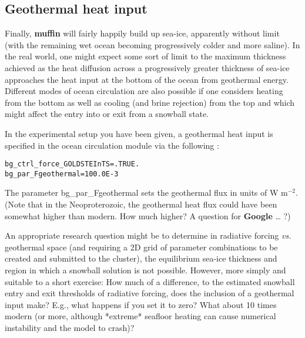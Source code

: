 \documentclass[11pt,fleqn]{book} %
\begin{document}
\vspace{1mm}


\subsection{Geothermal heat input}

Finally, \textbf{muffin} will fairly happily build up sea-ice, apparently without limit (with the remaining wet ocean becoming progressively colder and more saline). In the real world, one might expect some sort of limit to the maximum thickness achieved as the heat diffusion across a progressively greater thickness of sea-ice approaches the heat input at the bottom of the ocean from geothermal energy. Different modes of ocean circulation are also possible if one considers heating from the bottom as well as cooling (and brine rejection) from the top and which might affect the entry into or exit from a snowball state.

In the experimental setup you have been given, a geothermal heat input is specified in the ocean circulation module via the following :

\vspace{-2mm}
\begin{verbatim}
bg_ctrl_force_GOLDSTEInTS=.TRUE.
bg_par_Fgeothermal=100.0E-3
\end{verbatim}
\vspace{-2mm}

The parameter \textsf{\footnotesize bg\_par\_Fgeothermal} sets the geothermal flux in units of W m$^{-2}$. (Note that in the Neoproterozoic, the geothermal heat flux could have been somewhat higher than modern. How much higher? A question for \textbf{Google} … ?)

An appropriate research question might be to determine in radiative forcing \textit{vs.} geothermal space (and requiring a 2D grid of parameter combinations to be created and submitted to the cluster), the equilibrium sea-ice thickness and region in which a snowball solution is not possible. However, more simply and suitable to a short exercise: How much of a difference, to the estimated snowball entry and exit thresholds of radiative forcing, does the inclusion of a geothermal input make? E.g., what happens if you set it to zero? What about 10 times modern (or more, although *extreme* seafloor heating can cause numerical instability and the model to crash)?

\end{document}
